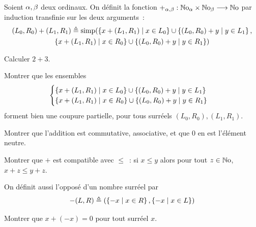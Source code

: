 \begin{problem}
  Soient $\alpha,\beta$ deux ordinaux. On définit la fonction
  $+_{\alpha,\beta} : \displaystyle \mathbb{N}\mathrm{o}_{\alpha}\times\mathbb{N}\mathrm{o}_{\beta} \longrightarrow \mathbb{N}\mathrm{o}$
  par induction transfinie sur les deux arguments~:
  \begin{multline*}
  (L_0,R_0) + (L_1,R_1) \triangleq \operatorname{simp}
  (\left\{ x + (L_1,R_1) \;\middle\vert\; x \in L_0 \right\}\cup\left\{ (L_0,R_0)+y \;\middle\vert\; y \in L_1 \right\},\\
  \left\{ x + (L_1,R_1) \;\middle\vert\; x \in R_0 \right\}\cup\left\{ (L_0,R_0)+y \;\middle\vert\; y \in R_1 \right\})
  \end{multline*}
  \begin{pbQuest}[resume]
  \item Calculer $2+3$.
  \item Montrer que les ensembles
    \[\begin{cases}
    \left\{ x + (L_1,R_1) \;\middle\vert\; x \in L_0 \right\}\cup\left\{ (L_0,R_0)+y \;\middle\vert\; y \in L_1 \right\}\\
    \left\{ x + (L_1,R_1) \;\middle\vert\; x \in R_0 \right\}\cup\left\{ (L_0,R_0)+y \;\middle\vert\; y \in R_1 \right\}
    \end{cases}\]
    forment bien une coupure partielle, pour tous surréels
    $(L_0,R_0),(L_1,R_1)$.
  \item Montrer que l'addition est commutative, associative, et que $0$ en est
    l'élément neutre.
  \item Montrer que $+$ est compatible avec $\leq$~: si $x \leq y$ alors pour
    tout $z \in \mathbb{N}\mathrm{o}$, $x + z \leq y + z$.
  \end{pbQuest}
  On définit aussi l'opposé d'un nombre surréel par
  \[-(L,R) \triangleq (\left\{ -x \;\middle\vert\; x \in R \right\},\left\{ -x \;\middle\vert\; x \in L \right\})\]
  \begin{pbQuest}[resume]
  \item Montrer que $x + (-x) = 0$ pour tout surréel $x$.
  \end{pbQuest}


\end{problem}
